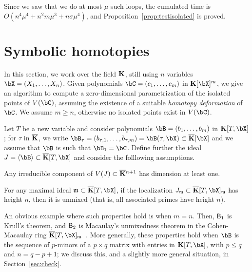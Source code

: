 \documentclass[12pt]{article}
\begin{document}
Since we saw that we do at most $\mu$ such loops, the cumulated time
is $O(n^4 \mu^4 + n^2 m \mu^3 + n \sigma \mu^4)$, and
Proposition~\ref{prop:testisolated} is proved.



\section{Symbolic homotopies}\label{sec:homotopy}

In this section, we work over the field $\mathbf{K}$, still using $n$ variables
$\bX=(X_1,\dots,X_n)$. Given polynomials $\bC=(c_1,\dots,c_m)$ in
$\KK[\bX]^m$, we give an algorithm to compute a zero-dimensional
parametrization of the isolated points of $V(\bC)$, assuming the
existence of a suitable {\em homotopy deformation} of $\bC$. We assume
$m\ge n$, otherwise no isolated points exist in $V(\bC)$.

Let $T$ be a new variable and consider polynomials
$\bB=(b_1,\dots,b_m)$ in $\KK[T,\bX]$; for $\tau$ in $\overline{\mathbf{K}}$,
we write $\bB_\tau=(b_{\tau,1},\dots,b_{\tau,m})=\bB(\tau,\bX)\subset
\KKbar[\bX]$ and we assume that $\bB$ is such that $\bB_1=\bC$.
Define further the ideal $J=\langle \bB \rangle \subset \KKbar[T,\bX]$ and
consider the folllowing assumptions.
\begin{description}[leftmargin=*]
\item[$\assA_1.$] Any irreducible component of $V(J) \subset
  \overline{\mathbf{K}}{}^{n+1}$ has dimension at least one.
\item[$\assA_2.$] For any maximal ideal $\m \subset\KKbar[T,\bX]$, if the
  localization $J_\m \subset \KKbar[T,\bX]_\m$ has height $n$, then it is
  unmixed (that is, all associated primes have height $n$).
\end{description}
An obvious example where such properties hold is when $m=n$. Then,
$\mathsf{B}_1$ is Krull's theorem, and $\mathsf{B}_2$ is Macaulay's unmixedness
theorem in the Cohen-Macaulay ring
$\KKbar[T,\bX]_\m$~\cite[Corollary~18.14]{Eisenbud95}. More generally,
these properties hold when $\bB$ is the sequence of $p$-minors of a $p
\times q$ matrix with entries in $\KK[T,\bX]$, with $p \le q$ and $n=q-p+1$; we
discuss this, and a slightly more general situation, in Section~\ref{sec:check}.  
\end{document}

